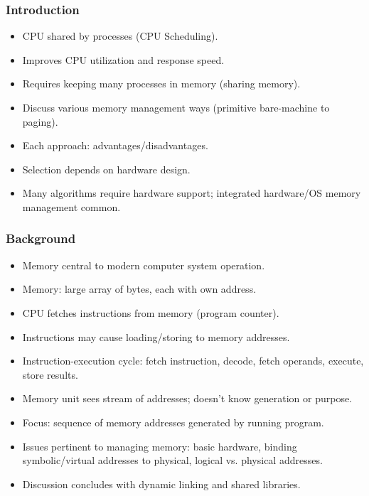 \subsubsection*{Introduction}
\begin{itemize}
    \item CPU shared by processes (CPU Scheduling).
    \item Improves CPU utilization and response speed.
    \item Requires keeping many processes in memory (sharing memory).
    \item Discuss various memory management ways (primitive bare-machine to paging).
    \item Each approach: advantages/disadvantages.
    \item Selection depends on hardware design.
    \item Many algorithms require hardware support; integrated hardware/OS memory management common.
\end{itemize}

\subsubsection*{Background}
\begin{itemize}
    \item Memory central to modern computer system operation.
    \item Memory: large array of bytes, each with own address.
    \item CPU fetches instructions from memory (program counter).
    \item Instructions may cause loading/storing to memory addresses.
    \item Instruction-execution cycle: fetch instruction, decode, fetch operands, execute, store results.
    \item Memory unit sees stream of addresses; doesn't know generation or purpose.
    \item Focus: sequence of memory addresses generated by running program.
    \item Issues pertinent to managing memory: basic hardware, binding symbolic/virtual addresses to physical, logical vs. physical addresses.
    \item Discussion concludes with dynamic linking and shared libraries.
\end{itemize}

